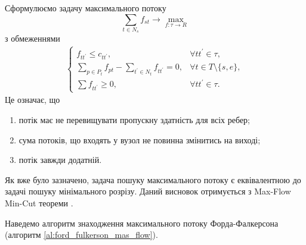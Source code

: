 Сформулюємо задачу максимального потоку
\begin{equation*}
    \sum_{t \in N_s} f_{st} \rightarrow \max_{f: \tau \rightarrow R }
\end{equation*}
з обмеженнями
\begin{equation*}
    \begin{gathered}
        \begin{cases}
            f_{tt^{'}} \leq  c_{tt^{'}},                                   & \forall tt^{'}  \in \tau ,         \\
            \sum_{p \in P_t} f_{pt} - \sum_{t^{'} \in N_t} f_{tt^{'}} = 0, & \forall t \in T \setminus \{s,e\}, \\
            \sum f_{tt^{'}} \geq 0,                                        & \forall tt^{'}  \in \tau.
        \end{cases}
    \end{gathered}
\end{equation*}
Це означає, що
\begin{enumerate}
    \item потік має не перевищувати пропускну здатність для всіх ребер;
    \item сума потоків, що входять у вузол не повинна змінитись на виході;
    \item потік завжди додатній.
\end{enumerate}

Як вже було зазначено,
задача пошуку максимального потоку є еквівалентною до задачі пошуку мінімального розрізу.
Даний висновок отримується з Max-Flow Min-Cut теореми \cite{bib:ford_fulkerson, bib:edmods_karp}.

Наведемо алгоритм знаходження максимального потоку Форда-Фалкерсона (алгоритм \ref{al:ford_fulkerson_mas_flow}).

